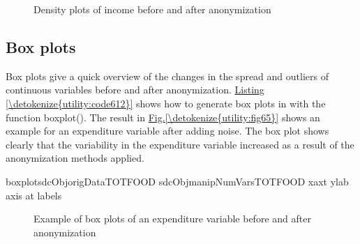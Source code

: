\documentclass[letterpaper,10pt,english]{sphinxmanual}
\begin{document}
\begin{figure}[htbp]
\centering
\capstart

\noindent{}
\caption{Density plots of income before and after anonymization}\label{\detokenize{utility:fig64}}\label{\detokenize{utility:id6}}\end{figure}


\subsection{Box plots}
\label{\detokenize{utility:box-plots}}
Box plots give a quick overview of the changes in the spread and
outliers of continuous variables before and after anonymization. \hyperref[\detokenize{utility:code612}]{Listing \ref{\detokenize{utility:code612}}}
shows how to generate box plots in  with the function boxplot().
The result in \hyperref[\detokenize{utility:fig65}]{Fig.\@ \ref{\detokenize{utility:fig65}}} shows an example for an expenditure variable
after adding noise. The box plot shows clearly that the variability in
the expenditure variable increased as a result of the anonymization
methods applied.

\def\sphinxLiteralBlockLabel{\label{\detokenize{utility:code612}}}
%
\begin{sphinxVerbatim}[commandchars=\\\{\},numbers=left,firstnumber=1,stepnumber=1]
boxplotsdcObjorigDataTOTFOOD sdcObjmanipNumVarsTOTFOOD
        xaxt   ylab  
axis at   labels   
\end{sphinxVerbatim}

\begin{figure}[htbp]
\centering
\capstart

\noindent{}
\caption{Example of box plots of an expenditure variable before and after anonymization}\label{\detokenize{utility:fig65}}\label{\detokenize{utility:id7}}\end{figure}
\end{document}
